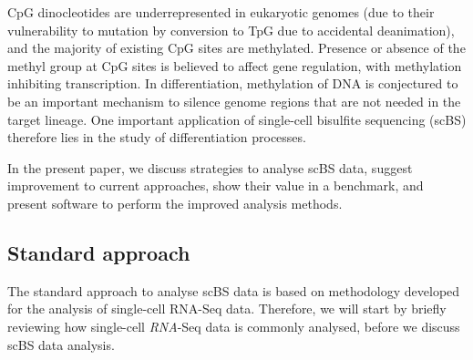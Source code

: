 \documentclass[twocolumn,10pt]{article}
\begin{document}
CpG dinocleotides are underrepresented in eukaryotic genomes (due to their vulnerability to mutation by conversion to TpG due to accidental deanimation), and the majority of existing CpG sites are methylated. Presence or absence of the methyl group at CpG sites is believed to affect gene regulation, with methylation inhibiting transcription. In differentiation, methylation of DNA is conjectured to be an important mechanism to silence genome regions that are not needed in the target lineage. One important application of single-cell bisulfite sequencing (scBS) therefore lies in the study of differentiation processes.

In the present paper, we discuss strategies to analyse scBS data, suggest improvement to current approaches, show their value in a benchmark, and present software to perform the improved analysis methods.

\subsection{Standard approach}

The standard approach to analyse scBS data is based on methodology developed for the analysis of single-cell RNA-Seq data. Therefore, we will start by briefly reviewing how single-cell \emph{RNA}-Seq data is commonly analysed, before we discuss scBS data analysis.
\end{document}
